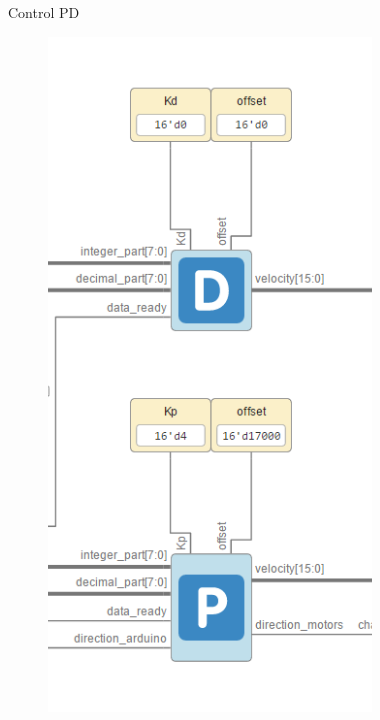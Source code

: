 \documentclass{beamer}
\begin{document}
\begin{frame}{Control PD}
	\begin{figure}[H]
		\center
		\includegraphics[trim = 0cm 0cm 0mm 0cm, clip,scale=0.5]{imagenes/Balancing_robot/PDControl.PNG}
	\end{figure}
\end{frame}
\end{document}
